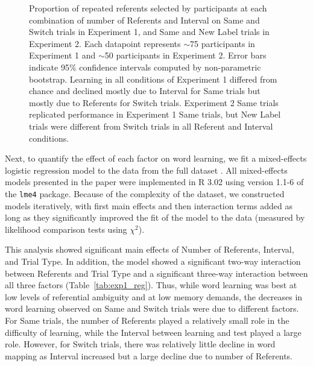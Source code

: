 \documentclass[man,floatsintext]{apa6}
\begin{document}
 \begin{figure}[t]
	\caption{\label{fig:exp1_2_data} Proportion of repeated referents selected by participants at each combination of number of Referents and Interval on Same and Switch trials in Experiment 1, and Same and New Label trials in Experiment 2. Each datapoint represents $\sim$75 participants in Experiment 1 and  $\sim$50 participants in Experiment 2. Error bars indicate 95\% confidence intervals computed by non-parametric bootstrap. Learning in all conditions of Experiment 1 differed from chance and declined mostly due to Interval for Same trials but mostly due to Referents for Switch trials. Experiment 2 Same trials replicated performance in Experiment 1 Same trials, but New Label trials were different from Switch trials in all Referent and Interval conditions.} 
\end{figure}

Next, to quantify the effect of each factor on word learning, we fit a mixed-effects logistic regression model to the data from the full dataset \cite{Baayen2008}. All mixed-effects models presented in the paper were implemented in R 3.02 using version 1.1-6 of the \texttt{lme4} package. Because of the complexity of the dataset, we constructed models iteratively, with first main effects and then interaction terms added as long as they significantly improved the fit of the model to the data (measured by likelihood comparison tests using $\chi^2$).

This analysis showed significant main effects of Number of Referents, Interval, and Trial Type. In addition, the model showed a significant two-way interaction between Referents and Trial Type and a significant three-way interaction between all three factors (Table~\ref{tab:exp1_reg}). Thus, while word learning was best at low levels of referential ambiguity and at low memory demands, the decreases in word learning observed on Same and Switch trials were due to different factors. For Same trials, the number of Referents played a relatively small role in the difficulty of learning, while the Interval between learning and test played a large role. However, for Switch trials, there was relatively little decline in word mapping as Interval increased but a large decline due to number of Referents. 
\end{document}
